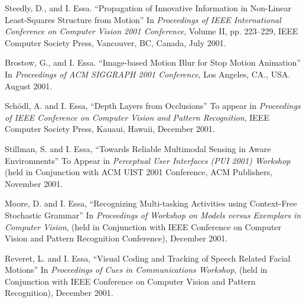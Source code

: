 \begin{pub}
\item Steedly, D., and I. Essa. ``Propagation of Innovative Information in Non-Linear
Least-Squares Structure from Motion'' In \textit{Proceedings of
IEEE International Conference on Computer Vision 2001 Conference},
Volume II, pp. 223--229, IEEE Computer Society Press, Vancouver,
BC, Canada, July 2001.  \label{pub:sfm-iccv01}

\item Brostow, G., and I. Essa.  ``Image-based Motion Blur for
Stop Motion Animation'' In \textit{Proceedings of ACM SIGGRAPH
2001 Conference}, Los Angeles, CA., USA. August 2001.
\label{pub:blur-siggraph01} 

\item Sch\"{o}dl, A. and I. Essa, ``Depth Layers from Occlusions''
To appear in \textit{Proceedings of IEEE Conference on Computer
Vision and Pattern Recognition}, IEEE Computer Society Press,
Kauaui, Hawaii, December 2001. \label{pub:schoedl01a}

\item Stillman, S. and I. Essa, ``Towards Reliable Multimodal Sensing in Aware Environments''
To Appear in \textit{Perceptual User Interfaces (PUI 2001)
Workshop} (held in Conjunction with ACM UIST 2001 Conference, ACM
Publishers, November 2001. \label{pub:stillman01a} 

\item Moore, D. and I. Essa, ``Recognizing Multi-tasking Activities using Context-Free Stochastic Grammar''
In \textit{Proceedings of Workshop on Models versus
Exemplars in Computer Vision}, (held in Conjunction with IEEE
Conference on Computer Vision and Pattern Recognition Conference),
December 2001. \label{pub:moore01a}

\item Reveret, L. and I. Essa, ``Visual Coding and Tracking of Speech Related Facial Motions''
In \textit{Proceedings of Cues in Communications
Workshop}, (held in Conjunction with IEEE Conference on Computer
Vision and Pattern Recognition), December 2001.
\label{pub:reveret01a}


\end{pub}
